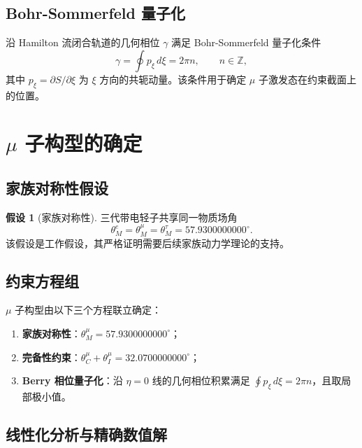 \documentclass[12pt,a4paper]{article}
\theoremstyle{definition}
\newtheorem{assumption}{假设}
\begin{document}
\subsection{Bohr-Sommerfeld 量子化}

沿 Hamilton 流闭合轨道的几何相位 $\gamma$ 满足 Bohr-Sommerfeld 量子化条件
\begin{equation}
\gamma=\oint p_\xi\,d\xi=2\pi n,\qquad n\in\mathbb{Z},
\end{equation}
其中 $p_\xi=\partial S/\partial\xi$ 为 $\xi$ 方向的共轭动量。该条件用于确定 $\mu$ 子激发态在约束截面上的位置。

\section{$\mu$ 子构型的确定}

\subsection{家族对称性假设}

\begin{assumption}[家族对称性]
三代带电轻子共享同一物质场角
\begin{equation}
\theta_M^e=\theta_M^\mu=\theta_M^\tau=57.9300000000^\circ.
\end{equation}
该假设是工作假设，其严格证明需要后续家族动力学理论的支持。
\end{assumption}

\subsection{约束方程组}

$\mu$ 子构型由以下三个方程联立确定：
\begin{enumerate}
\item \textbf{家族对称性}：$\theta_M^\mu=57.9300000000^\circ$；
\item \textbf{完备性约束}：$\theta_C^\mu+\theta_I^\mu=32.0700000000^\circ$；
\item \textbf{Berry 相位量子化}：沿 $\eta=0$ 线的几何相位积累满足 $\oint p_\xi\,d\xi=2\pi n$，且取局部极小值。
\end{enumerate}

\subsection{线性化分析与精确数值解}
\end{document}
